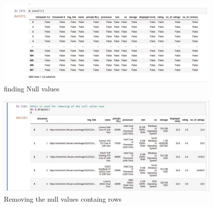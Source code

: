 \begin{figure}[h]
\centering
\footnotesize
\includegraphics[width=7in]{23.jpeg}
\caption{finding Null values}
\label{fig:unevenlight}
\end{figure}
\vspace{7\baselineskip}

\begin{figure}[h]
\centering
\footnotesize
\includegraphics[width=7in]{28.jpeg}
\caption{Removing the null values containg rows}
\label{fig:unevenlight}
\end{figure}
\vspace{9\baselineskip}



